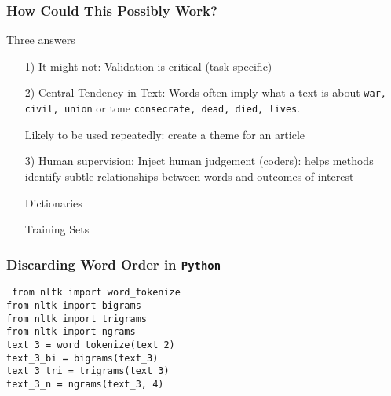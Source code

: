 \documentclass{beamer}
\numberwithin{equation}{section}
\begin{document}
\begin{frame}
\frametitle{How Could This Possibly Work?}

Three answers
\begin{itemize}
\item[1)] \alert{It might not}: Validation is critical (task specific)
\item[2)] \alert{Central Tendency in Text}: Words often imply what a text is about
{\tt war, civil, union} or tone {\tt consecrate, dead, died, lives}.
\item[] Likely to be used repeatedly: create a theme for an article
\item[3)] \alert{Human supervision}: Inject human judgement (coders): helps methods identify subtle relationships between words and outcomes of interest
\item[] \alert{Dictionaries}
\item[] \alert{Training Sets}
\end{itemize}

\end{frame}


\begin{frame}
\frametitle{Discarding Word Order in {\tt Python}}

{\tt
from nltk import word\_tokenize \\
from nltk import bigrams \\
from nltk import trigrams \\
from nltk import ngrams \\

\vspace{0.25in}
text\_3 = word\_tokenize(text\_2) \\
text\_3\_bi = bigrams(text\_3) \\
text\_3\_tri = trigrams(text\_3)\\
text\_3\_n = ngrams(text\_3, 4)\\

}


\end{frame}
\end{document}
